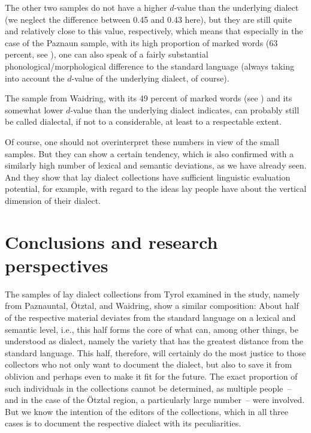 \documentclass[output=paper]{langscibook}
\begin{document}
The other two samples do not have a higher $d$-value than the underlying dialect (we neglect the difference between 0.45 and 0.43 here), but they are still quite and relatively close to this value, respectively, which means that especially in the case of the Paznaun sample, with its high proportion of marked words (63 percent, see ), one can also speak of a fairly substantial phonological/morphological difference to the standard language (always taking into account the $d$-value of the underlying dialect, of course).

The sample from Waidring, with its 49 percent  of marked words (see ) and its somewhat lower $d$-value than the underlying dialect indicates, can probably still be called dialectal, if not to a considerable, at least to a respectable extent.

Of course, one should not overinterpret these numbers in view of the small samples. But they can show a certain tendency, which is also confirmed with a similarly high number of lexical and semantic deviations, as we have already seen. And they show that lay dialect collections have sufficient linguistic evaluation potential, for example, with regard to the ideas lay people have about the vertical dimension of their dialect.

\section{Conclusions and research perspectives}
\label{sec:kathrein:6}

The samples of lay dialect collections from Tyrol examined in the study, namely from Paznauntal, Ötztal, and Waidring, show a similar composition: About half of the respective material deviates from the standard language on a lexical and semantic level, i.e., this half forms the core of what can, among other things, be understood as dialect, namely the variety that has the greatest distance from the standard language. This half, therefore, will certainly do the most justice to those collectors who not only want to document the dialect, but also to save it from oblivion and perhaps even to make it fit for the future. The exact proportion of such individuals in the collections cannot be determined, as multiple people~-- and in the case of the Ötztal region, a particularly large number~-- were involved. But we know the intention of the editors of the collections, which in all three cases is to document the respective dialect with its peculiarities.
\end{document}
